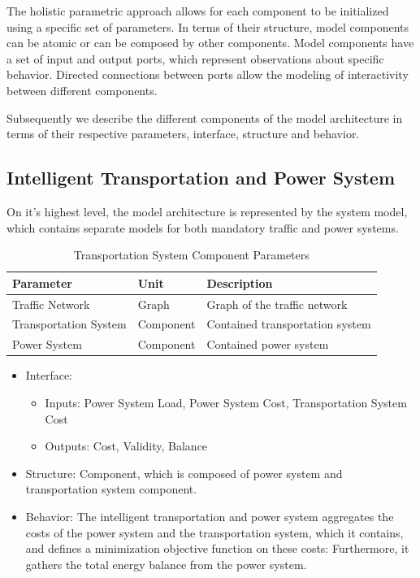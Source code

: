 The holistic parametric approach allows for each component to be initialized using a specific set of parameters. In terms of their structure, model components can be atomic or can be composed by other components. Model components have a set of input and output ports, which represent observations about specific behavior. Directed connections between ports allow the modeling of interactivity between different components. 

Subsequently we describe the different components of the model architecture in terms of their respective parameters, interface, structure and behavior. 

\subsection{Intelligent Transportation and Power System}
On it's highest level, the model architecture is represented by the system model, which contains separate models for both mandatory traffic and power systems.

	 \begin{table}[h]
	 	\renewcommand{\arraystretch}{1.3}
	 	\caption{Transportation System Component Parameters}
	 	\centering
	 	\begin{tabular}{lll}
	 		\hline
	 		\textbf{Parameter}                    & \textbf{Unit} & \textbf{Description} \\ \hline
	 		Traffic Network                  	  & Graph          & Graph of the traffic network      \\
	 		Transportation System                 & Component    & Contained transportation system    \\ 
	 		Power System                 		  & Component   & Contained power system    \\ \hline
	 	\end{tabular}
	 \end{table}
	 \begin{itemize}
	\item Interface: 
			\begin{itemize}
				\item Inputs: Power System Load, Power System Cost, Transportation System Cost
				\item Outputs: Cost, Validity, Balance
			\end{itemize}	
	\item Structure: Component, which is composed of power system and transportation system component.
	\item Behavior: The intelligent transportation and power system aggregates the costs of the power system and the transportation system, which it contains, and defines a minimization objective function on these costs:
	Furthermore, it gathers the total energy balance from the power system.
\end{itemize}


